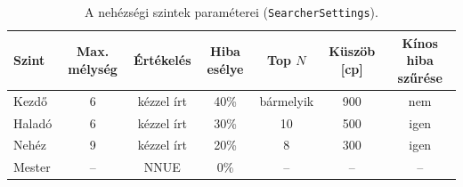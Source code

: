 \begin{table}[!ht]
	\footnotesize
	\centering
	\begin{tabular}{l c c c c c c}
		\toprule
		Szint & Max. mélység & Értékelés & Hiba esélye & Top $N$ & Küszöb [cp] & Kínos hiba szűrése \\
		\midrule
		Kezdő & 6 & kézzel írt & 40\% & bármelyik & 900 & nem \\
		Haladó & 6 & kézzel írt & 30\% & 10 & 500 & igen \\
		Nehéz & 9 & kézzel írt & 20\% & 8 & 300 & igen \\
		Mester & -- & NNUE & 0\% & -- & -- & -- \\
		\bottomrule
	\end{tabular}
	\caption{A nehézségi szintek paraméterei (\texttt{SearcherSettings}).}
	\label{tab:difficulty}
\end{table}
